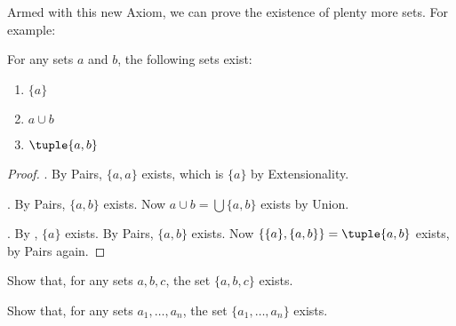 \documentclass[../../../include/open-logic-section]{subfiles}
\begin{document}
Armed with this new Axiom, we can prove the existence of plenty more sets. For example:
\begin{prop}For any sets $a$ and $b$, the following sets exist:
		\begin{enumerate}
			\item{} $\{a\}$
			\item{} $a \cup b$
			\item{} $\tuple{a, b}$
		\end{enumerate}
\end{prop}
\begin{proof}
	. By Pairs, $\{a, a\}$ exists, which is $\{a\}$ by Extensionality. 
	
	. By Pairs, $\{a, b\}$ exists. Now $a \cup b = \bigcup \{a, b\}$ exists by Union. 

	. By , $\{a\}$ exists. By Pairs, $\{a, b\}$ exists. Now $\{\{a\}, \{a, b\}\} = \tuple{a, b}$ exists, by Pairs again.
\end{proof}
\begin{prob} Show that, for any sets $a, b, c$, the set $\{a, b, c\}$ exists.
\end{prob}
\begin{prob} Show that, for any sets $a_1, \ldots, a_n$, the set $\{a_1, \ldots, a_n\}$ exists.
\end{prob}
\end{document}
